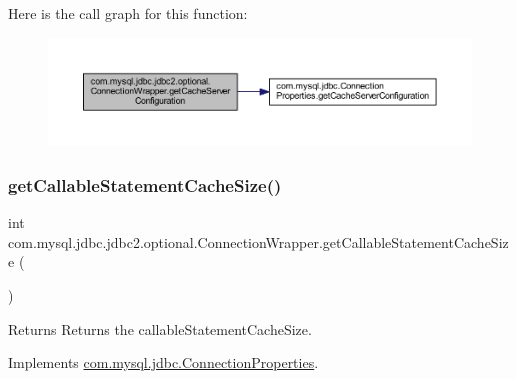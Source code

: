 Here is the call graph for this function\+:
\nopagebreak
\begin{figure}[H]
\begin{center}
\leavevmode
\includegraphics[width=350pt]{classcom_1_1mysql_1_1jdbc_1_1jdbc2_1_1optional_1_1_connection_wrapper_a3338701a08234fb035685c6e0ce5b77c_cgraph}
\end{center}
\end{figure}
\mbox{\label{classcom_1_1mysql_1_1jdbc_1_1jdbc2_1_1optional_1_1_connection_wrapper_a48786ec7533fa394062c533e06a8cce7}} 
\subsubsection{\texorpdfstring{get\+Callable\+Statement\+Cache\+Size()}{getCallableStatementCacheSize()}}
{\footnotesize\ttfamily int com.\+mysql.\+jdbc.\+jdbc2.\+optional.\+Connection\+Wrapper.\+get\+Callable\+Statement\+Cache\+Size (\begin{DoxyParamCaption}{ }\end{DoxyParamCaption})}

\begin{DoxyReturn}{Returns}
Returns the callable\+Statement\+Cache\+Size. 
\end{DoxyReturn}


Implements \mbox{\hyperlink{interfacecom_1_1mysql_1_1jdbc_1_1_connection_properties_a413ae8156c79a09e68023792a88351ac}{com.\+mysql.\+jdbc.\+Connection\+Properties}}.


